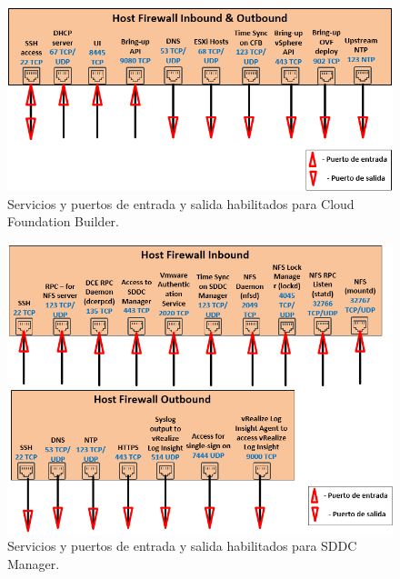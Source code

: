 \begin{figure}[h!]
  \centering
  \includegraphics[width=1\textwidth]{imaxes/conceptosPrevios/firewall_CloudBuilder.png}
  \caption{Servicios y puertos de entrada y salida habilitados para Cloud Foundation Builder.}
  \label{fig:puertosCB}
\end{figure}
\begin{figure}[h!]
  \centering
  \includegraphics[width=1\textwidth]{imaxes/conceptosPrevios/firewall_SDDC.png}
  \caption{Servicios y puertos de entrada y salida habilitados para SDDC Manager.}
  \label{fig:puertosSDDC}
\end{figure}

\FloatBarrier

